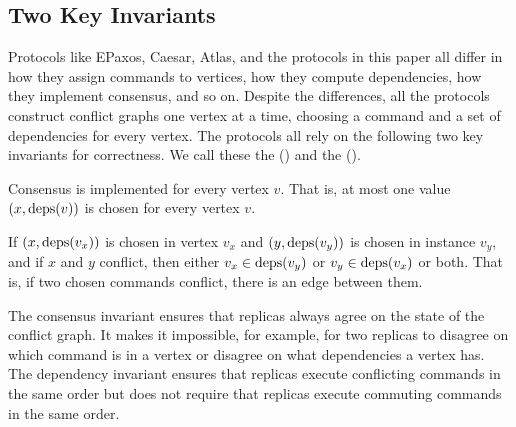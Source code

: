 \subsection{Two Key Invariants}
Protocols like EPaxos, Caesar, Atlas, and the \BPaxos{} protocols in this paper
all differ in how they assign commands to vertices, how they compute
dependencies, how they implement consensus, and so on. Despite the differences,
all the protocols construct conflict graphs one vertex at a time, choosing a
command and a set of dependencies for every vertex. The protocols all rely on
the following two key invariants for correctness. We call these the
 () and the
 ().

\begin{invariant}
  Consensus is implemented for every vertex $v$. That is, at most one value
  $(x, \text{deps}(v))$ is chosen for every vertex $v$.
\end{invariant}%

\begin{invariant}
  If $(x, \text{deps}(v_x))$ is chosen in vertex $v_x$ and $(y, \text{deps}(v_y))$ is
  chosen in instance $v_y$, and if $x$ and $y$ conflict, then either $v_x \in
  \text{deps}(v_y)$ or $v_y \in \text{deps}(v_x)$ or both. That is, if two chosen commands
  conflict, there is an edge between them.
\end{invariant}

The consensus invariant ensures that replicas always agree on the state of the
conflict graph. It makes it impossible, for example, for two replicas to
disagree on which command is in a vertex or disagree on what dependencies a
vertex has. The dependency invariant ensures that replicas execute conflicting
commands in the same order but does not require that replicas execute commuting
commands in the same order.

% 
